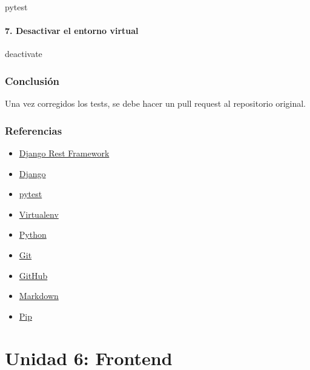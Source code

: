 \documentclass[
  a4paper,
  DIV=11,
  numbers=noendperiod,
  onepage,
  openany]{scrreprt}
\newenvironment{Shaded}{\begin{snugshade}}{\end{snugshade}}
\newcommand{\NormalTok}[1]{\textcolor[rgb]{0.00,0.23,0.31}{#1}}
\providecommand{\tightlist}{%
  \setlength{\itemsep}{0pt}\setlength{\parskip}{0pt}}\usepackage{longtable,booktabs,array}
\begin{document}
\begin{Shaded}
\begin{Highlighting}[]
\NormalTok{pytest}
\end{Highlighting}
\end{Shaded}

\subsection{7. Desactivar el entorno
virtual}\label{desactivar-el-entorno-virtual}

\begin{Shaded}
\begin{Highlighting}[]
\NormalTok{deactivate}
\end{Highlighting}
\end{Shaded}

\section{Conclusión}\label{conclusiuxf3n-1}

Una vez corregidos los tests, se debe hacer un pull request al
repositorio original.

\section{Referencias}\label{referencias-1}

\begin{itemize}
\tightlist
\item
  \href{https://www.django-rest-framework.org/}{Django Rest Framework}
\item
  \href{https://www.djangoproject.com/}{Django}
\item
  \href{https://docs.pytest.org/en/latest/}{pytest}
\item
  \href{https://virtualenv.pypa.io/en/latest/}{Virtualenv}
\item
  \href{https://www.python.org/}{Python}
\item
  \href{https://git-scm.com/}{Git}
\item
  \href{https://www.github.com/}{GitHub}
\item
  \href{https://www.markdownguide.org/}{Markdown}
\item
  \href{https://pypi.org/project/pip/}{Pip}
\end{itemize}

\part{Unidad 6: Frontend}
\end{document}
